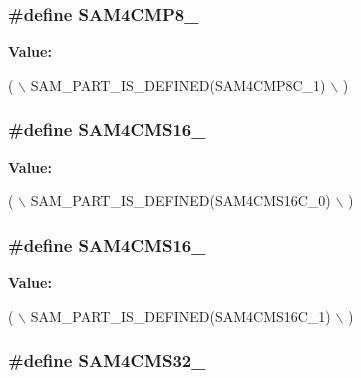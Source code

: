 \hypertarget{group__sam__part__macros__group_ga7f686a5c46c9cfa8ab0d97ec4f257fb7}{
\subsubsection[{S\-A\-M4\-C\-M\-P8\-\_\-1}]{\setlength{\rightskip}{0pt plus 5cm}\#define S\-A\-M4\-C\-M\-P8\-\_}}\label{group__sam__part__macros__group_ga7f686a5c46c9cfa8ab0d97ec4f257fb7}
{\bfseries Value\-:}
\begin{DoxyCode}
( \(\backslash\)
                SAM\_PART\_IS\_DEFINED(SAM4CMP8C\_1) \(\backslash\)
                )
\end{DoxyCode}
\hypertarget{group__sam__part__macros__group_ga7939b0b91125cd9bd2c327d271599014}{
\subsubsection[{S\-A\-M4\-C\-M\-S16\-\_\-0}]{\setlength{\rightskip}{0pt plus 5cm}\#define S\-A\-M4\-C\-M\-S16\-\_}}\label{group__sam__part__macros__group_ga7939b0b91125cd9bd2c327d271599014}
{\bfseries Value\-:}
\begin{DoxyCode}
( \(\backslash\)
                SAM\_PART\_IS\_DEFINED(SAM4CMS16C\_0) \(\backslash\)
                )
\end{DoxyCode}
\hypertarget{group__sam__part__macros__group_gaf4031be5e4d4319df37b6d2f536641cd}{
\subsubsection[{S\-A\-M4\-C\-M\-S16\-\_\-1}]{\setlength{\rightskip}{0pt plus 5cm}\#define S\-A\-M4\-C\-M\-S16\-\_}}\label{group__sam__part__macros__group_gaf4031be5e4d4319df37b6d2f536641cd}
{\bfseries Value\-:}
\begin{DoxyCode}
( \(\backslash\)
                SAM\_PART\_IS\_DEFINED(SAM4CMS16C\_1) \(\backslash\)
                )
\end{DoxyCode}
\hypertarget{group__sam__part__macros__group_gaaaf9613986a1e170c45e4ff09e82cf7a}{
\subsubsection[{S\-A\-M4\-C\-M\-S32\-\_\-0}]{\setlength{\rightskip}{0pt plus 5cm}\#define S\-A\-M4\-C\-M\-S32\-\_}}\label{group__sam__part__macros__group_gaaaf9613986a1e170c45e4ff09e82cf7a}
